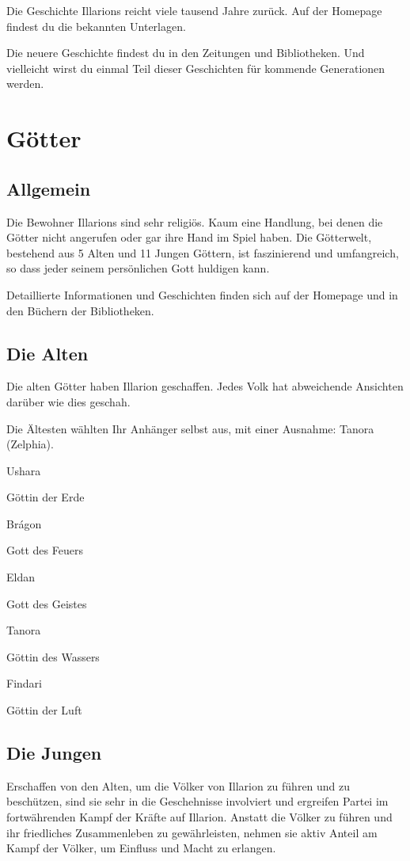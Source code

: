 \documentclass[a4paper,11pt]{book}
\begin{document}
Die Geschichte Illarions reicht viele tausend Jahre zurück. Auf der Homepage findest du die bekannten Unterlagen.

Die neuere Geschichte findest du in den Zeitungen und Bibliotheken. Und vielleicht wirst du einmal Teil dieser Geschichten für kommende Generationen werden.

\section{Götter}

\subsection{Allgemein}

Die Bewohner Illarions sind sehr religiös. Kaum eine Handlung, bei denen die Götter nicht angerufen oder gar ihre Hand im Spiel haben. Die Götterwelt, bestehend aus 5 Alten und 11 Jungen Göttern, ist faszinierend und umfangreich, so dass jeder seinem persönlichen Gott huldigen kann.

Detaillierte Informationen und Geschichten finden sich auf der Homepage und in den Büchern der Bibliotheken.

\subsection{Die Alten}

Die alten Götter haben Illarion geschaffen. Jedes Volk hat abweichende Ansichten darüber wie dies geschah.

Die Ältesten wählten Ihr Anhänger selbst aus, mit einer Ausnahme: Tanora (Zelphia).

Ushara

Göttin der Erde

Brágon

Gott des Feuers

Eldan

Gott des Geistes

Tanora

Göttin des Wassers

Findari

Göttin der Luft

\subsection{Die Jungen}

Erschaffen von den Alten, um die Völker von Illarion zu führen und zu beschützen, sind sie sehr in die Geschehnisse involviert und ergreifen Partei im fortwährenden Kampf der Kräfte auf Illarion. Anstatt die Völker zu führen und ihr friedliches Zusammenleben zu gewährleisten, nehmen sie aktiv Anteil am Kampf der Völker, um Einfluss und Macht zu erlangen.
\end{document}
